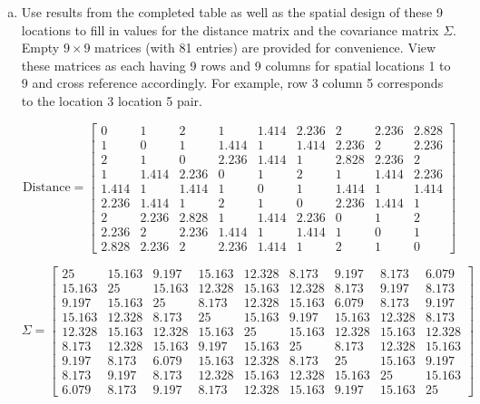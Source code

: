 \documentclass[letterpaper, 12pt]{article}\usepackage[]{graphicx}\usepackage[]{color}
\begin{document}
\begin{enumerate}[a.]
\item
Use results from the completed table as well as the spatial design of these 9 locations to fill in values for the distance matrix and the covariance matrix $\Sigma$. Empty $9 \times 9$ matrices (with 81 entries) are provided for convenience. View these matrices as each having 9 rows and 9 columns for spatial locations 1 to 9 and cross reference accordingly. For example, row 3 column 5 corresponds to the location 3 location 5 pair.





\[
\text{Distance} = \begin{bmatrix}
 0 & 1 & 2 & 1 & 1.414 & 2.236 & 2 & 2.236 & 2.828 \\
 1 & 0 & 1 & 1.414 & 1 & 1.414 & 2.236 & 2 & 2.236 \\
 2 & 1 & 0 & 2.236 & 1.414 & 1 & 2.828 & 2.236 & 2 \\
 1 & 1.414 & 2.236 & 0 & 1 & 2 & 1 & 1.414 & 2.236 \\
 1.414 & 1 & 1.414 & 1 & 0 & 1 & 1.414 & 1 & 1.414 \\
 2.236 & 1.414 & 1 & 2 & 1 & 0 & 2.236 & 1.414 & 1 \\
 2 & 2.236 & 2.828 & 1 & 1.414 & 2.236 & 0 & 1 & 2 \\
 2.236 & 2 & 2.236 & 1.414 & 1 & 1.414 & 1 & 0 & 1 \\
 2.828 & 2.236 & 2 & 2.236 & 1.414 & 1 & 2 & 1 & 0\end{bmatrix}\]



\[
\Sigma = \begin{bmatrix}
 25 & 15.163 & 9.197 & 15.163 & 12.328 & 8.173 & 9.197 & 8.173 & 6.079 \\
 15.163 & 25 & 15.163 & 12.328 & 15.163 & 12.328 & 8.173 & 9.197 & 8.173 \\
 9.197 & 15.163 & 25 & 8.173 & 12.328 & 15.163 & 6.079 & 8.173 & 9.197 \\
 15.163 & 12.328 & 8.173 & 25 & 15.163 & 9.197 & 15.163 & 12.328 & 8.173 \\
 12.328 & 15.163 & 12.328 & 15.163 & 25 & 15.163 & 12.328 & 15.163 & 12.328 \\
 8.173 & 12.328 & 15.163 & 9.197 & 15.163 & 25 & 8.173 & 12.328 & 15.163 \\
 9.197 & 8.173 & 6.079 & 15.163 & 12.328 & 8.173 & 25 & 15.163 & 9.197 \\
 8.173 & 9.197 & 8.173 & 12.328 & 15.163 & 12.328 & 15.163 & 25 & 15.163 \\
 6.079 & 8.173 & 9.197 & 8.173 & 12.328 & 15.163 & 9.197 & 15.163 & 25\end{bmatrix}\]





\end{enumerate}
\end{document}
